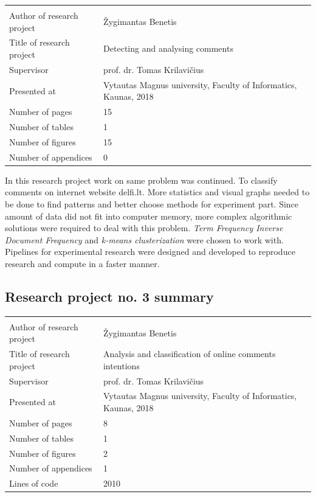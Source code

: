 \documentclass[a4paper,12pt]{article}
\begin{document}
	
	\noindent
	\begin{center}
		\begin{tabular}{L{4.5cm} L{8cm}}
			\\ 
			Author of research project & Žygimantas Benetis \\
			Title of research project & Detecting and analysing comments\\
			Supervisor & prof. dr. Tomas Krilavičius\\
			Presented at & Vytautas Magnus university, Faculty of Informatics, Kaunas, 2018\\
			Number of pages & 15\\
			Number of tables & 1\\
			Number of figures & 15\\
			Number of appendices & 0\\
		\end{tabular}
	\end{center} 
	
	\vspace{5mm}
	
	In this research project work on same problem was continued. To classify comments on internet website delfi.lt. More statistics  and visual graphs needed to be done to find patterns and better choose methods for experiment part. Since amount of data did not fit into computer memory, more complex algorithmic solutions were required to deal with this problem. \textit{Term Frequency Inverse Document Frequency} and \textit{k-means clusterization} were chosen to work with. Pipelines for experimental research were designed and developed to reproduce research and compute in a faster manner.
	
	\clearpage
	
	
	\subsection{Research project no. 3 summary}
	
	
	\noindent
	\begin{center}
		\begin{tabular}{L{4.5cm} L{8cm}}
			\\ 
			Author of research project & Žygimantas Benetis \\
			Title of research project & Analysis and classification of online comments intentions\\
			Supervisor & prof. dr. Tomas Krilavičius\\
			Presented at & Vytautas Magnus university, Faculty of Informatics, Kaunas, 2018\\
			Number of pages & 8\\
			Number of tables & 1\\
			Number of figures & 2\\
			Number of appendices & 1\\
			Lines of code & 2010\\
		\end{tabular}
	\end{center} 
	
\end{document}
